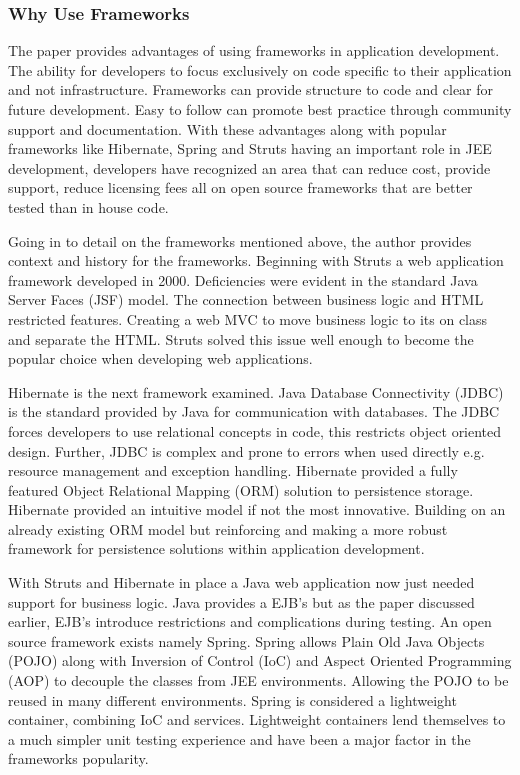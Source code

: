 										\subsubsection{Why Use Frameworks}
										The paper provides advantages of using frameworks in application development. The ability for developers to focus exclusively on code specific to their application and not infrastructure. Frameworks can provide structure to code and clear for future development. Easy to follow can promote best practice through community support and documentation. With these advantages along with popular frameworks like Hibernate, Spring and Struts having an important role in JEE development, developers have recognized an area that can reduce cost, provide support, reduce licensing fees all on open source frameworks that are better tested than in house code.
										
										Going in to detail on the frameworks mentioned above, the author provides context and history for the frameworks. Beginning with Struts a web application framework developed in 2000. Deficiencies were evident in the standard Java Server Faces (JSF) model. The connection between business logic and HTML restricted features. Creating a web MVC to move business logic to its on class and separate the HTML. Struts solved this issue well enough to become the popular choice when developing web applications. 
										
										Hibernate is the next framework examined. Java Database Connectivity (JDBC) is the standard provided by Java for communication with databases. The JDBC forces developers to use relational concepts in code, this restricts object oriented design. Further, JDBC is complex and prone to errors when used directly e.g. resource management and exception handling. Hibernate provided a fully featured Object Relational Mapping (ORM) solution to persistence storage. Hibernate provided an intuitive model if not the most innovative. Building on an already existing ORM model but reinforcing and making a more robust framework for persistence solutions within application development.
										
										With Struts and Hibernate in place a Java web application now just needed support for business logic. Java provides a EJB’s but as the paper discussed earlier, EJB’s introduce restrictions and complications during testing. An open source framework exists namely Spring. Spring allows Plain Old Java Objects (POJO) along with Inversion of Control (IoC) and Aspect Oriented Programming (AOP) to decouple the classes from JEE environments. Allowing the POJO to be reused in many different environments. Spring is considered a lightweight container, combining IoC and services. Lightweight containers lend themselves to a much simpler unit testing experience and have been a major factor in the frameworks popularity.
										
